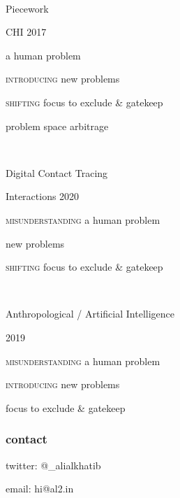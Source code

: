 \documentclass[aspectratio=169,17pt]{beamer} %
\begin{document}
\begin{frame}[standout]
~

Piecework

\hfill \alert{\small CHI 2017}
\end{frame}


\begin{frame}[plain]

  \centering
  { a human problem}

  {{\scshape introducing} new problems}

  {{\scshape shifting} focus to exclude \& gatekeep}

\end{frame}


\begin{frame}[standout]

problem space arbitrage

\end{frame}

\begin{frame}[standout]
~

Digital Contact Tracing

\hfill \alert{\small Interactions 2020}
\end{frame}

\begin{frame}[plain]

  \centering
  {{\scshape misunderstanding} a human problem}

  { new problems}

  {{\scshape shifting} focus to exclude \& gatekeep}

\end{frame}


\begin{frame}[standout]
~

Anthropological / Artificial Intelligence

\hfill \alert{\small 2019}
\end{frame}

\begin{frame}[plain]

  \centering
  {{\scshape misunderstanding} a human problem}

  {{\scshape introducing} new problems}

  { focus to exclude \& gatekeep}

\end{frame}




\begin{frame}[standout]


\end{frame}



\begin{frame}
    


\end{frame}

\begin{frame}\frametitle{contact}

{\LARGE
twitter: @\_alialkhatib

\vspace{2em}

email: hi@al2.in
}

\end{frame}
\end{document}
